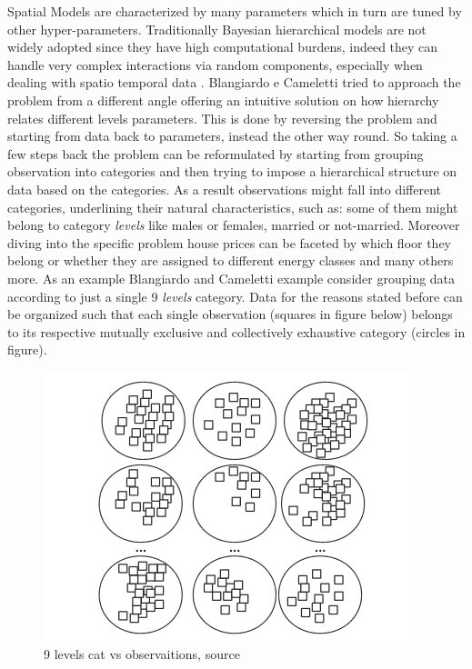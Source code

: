 \documentclass[
  12pt,
  a4paper,
  oneside]{book}
\begin{document}
Spatial Models are characterized by many parameters which in turn are tuned by other hyper-parameters. Traditionally Bayesian hierarchical models are not widely adopted since they have high computational burdens, indeed they can handle very complex interactions via random components, especially when dealing with spatio temporal data \citet{Ling}. Blangiardo e Cameletti \citeyearpar{Blangiardo-Cameletti} tried to approach the problem from a different angle offering an intuitive solution on how hierarchy relates different levels parameters. This is done by reversing the problem and starting from data back to parameters, instead the other way round. So taking a few steps back the problem can be reformulated by starting from grouping observation into categories and then trying to impose a hierarchical structure on data based on the categories. As a result observations might fall into different categories, underlining their natural characteristics, such as: some of them might belong to category \emph{levels} like males or females, married or not-married. Moreover diving into the specific problem house prices can be faceted by which floor they belong or whether they are assigned to different energy classes and many others more. As an example Blangiardo and Cameletti example consider grouping data according to just a single 9 \emph{levels} category. Data for the reasons stated before can be organized such that each single observation (squares in figure below) belongs to its respective mutually exclusive and collectively exhaustive category (circles in figure).

\begin{figure}
\centering
\includegraphics{images/simple.PNG}
\caption{9 levels cat vs observaitions, source \citet{Blangiardo-Cameletti}}
\end{figure}
\end{document}
